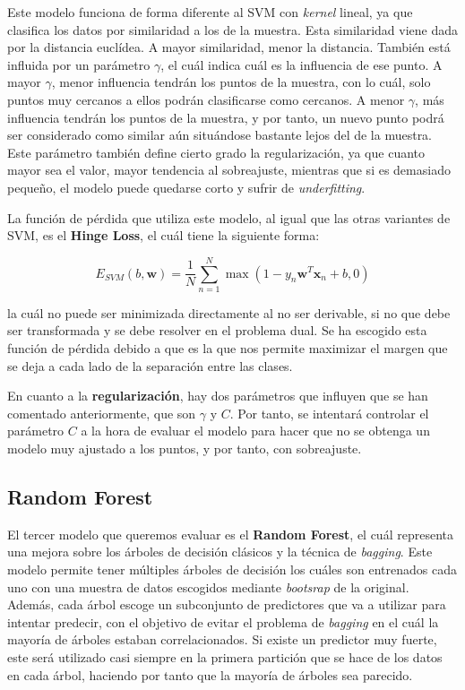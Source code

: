 \documentclass[11pt,a4paper]{article}
\begin{document}
Este modelo funciona de forma diferente al SVM con \textit{kernel} lineal, ya que clasifica los datos por similaridad a los de la muestra.
Esta similaridad viene dada por la distancia euclídea. A mayor similaridad, menor la distancia. También está influida por un parámetro
$\gamma$, el cuál indica cuál es la influencia de ese punto. A mayor $\gamma$, menor influencia tendrán los puntos de la muestra, con lo cuál,
solo puntos muy cercanos a ellos podrán clasificarse como cercanos. A menor $\gamma$, más influencia tendrán los puntos de la muestra, y por
tanto, un nuevo punto podrá ser considerado como similar aún situándose bastante lejos del de la muestra. Este parámetro también define
cierto grado la regularización, ya que cuanto mayor sea el valor, mayor tendencia al sobreajuste, mientras que si es demasiado pequeño,
el modelo puede quedarse corto y sufrir de \textit{underfitting}.

La función de pérdida que utiliza este modelo, al igual que las otras variantes de SVM, es el \textbf{Hinge Loss}, el cuál tiene la siguiente
forma:

\begin{equation}
\label{eq:hinge-loss}
E_{SVM}(b, \mathbf{w}) = \frac{1}{N} \sum_{n=1}^N \max(1 - y_n \mathbf{w}^T\mathbf{x}_n + b , 0)
\end{equation}

\noindent la cuál no puede ser minimizada directamente al no ser derivable, si no que debe ser transformada y se debe resolver en el problema
dual. Se ha escogido esta función de pérdida debido a que es la que nos permite maximizar el margen que se deja a cada lado de la separación
entre las clases.

En cuanto a la \textbf{regularización}, hay dos parámetros que influyen que se han comentado anteriormente, que son $\gamma$ y $C$. Por tanto, se
intentará controlar el parámetro $C$ a la hora de evaluar el modelo para hacer que no se obtenga un modelo muy ajustado a los puntos, y por
tanto, con sobreajuste.

\subsection{Random Forest}

El tercer modelo que queremos evaluar es el \textbf{Random Forest}, el cuál representa una mejora sobre los árboles de decisión clásicos y la técnica
de \textit{bagging}. Este modelo permite tener múltiples árboles de decisión los cuáles son entrenados cada uno con una muestra de datos
escogidos mediante \textit{bootsrap} de la original. Además, cada árbol escoge un subconjunto de predictores que va a utilizar para intentar
predecir, con el objetivo de evitar el problema de \textit{bagging} en el cuál la mayoría de árboles estaban correlacionados. Si
existe un predictor muy fuerte, este será utilizado casi siempre en la primera partición que se hace de los datos en cada árbol, haciendo por
tanto que la mayoría de árboles sea parecido.
\end{document}

